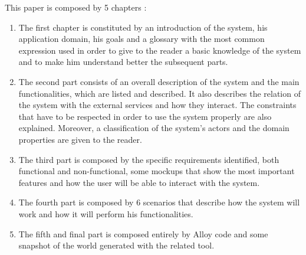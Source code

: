 This paper is composed by 5 chapters :
\begin{enumerate}
	\setlength{\leftskip}{0.5cm}
	\item The first chapter is constituted by an introduction of the system, his application domain, his goals and a glossary with the most common expression used in order to give to the reader a basic knowledge of the system and to make him understand better the subsequent parts.
	\item The second part consists of an overall description of the system and the main functionalities, which are listed and described. It also describes the relation of the system with the external services and how they interact. The constraints that have to be respected in order to use the system properly are also explained.
	Moreover, a classification of the system’s actors and the domain properties are given to the reader.
	\item The third part is composed by the specific requirements identified, both functional and non-functional, some mockups that show the most important features and how the user will be able to interact with the system.
	\item The fourth part is composed by 6 scenarios that describe how the system will work and how it will perform his functionalities.
	\item The fifth and final part is composed entirely by Alloy code and some snapshot of the world generated with the related tool.
\end{enumerate}